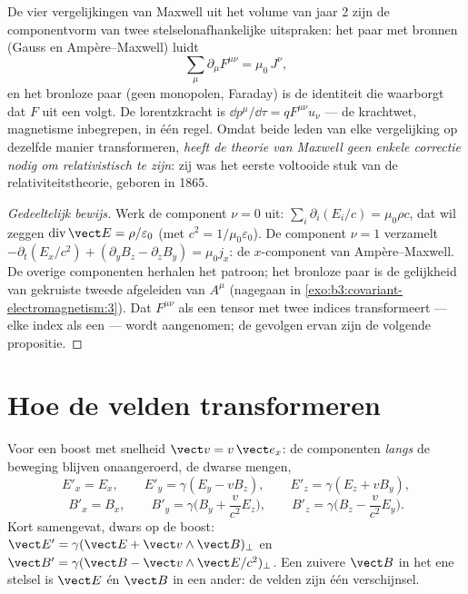 \begin{theorem}\label{thm:b3:covariant-electromagnetism:maxwell}
De vier vergelijkingen van Maxwell uit het volume van jaar 2 zijn de
componentvorm van twee stelselonafhankelijke uitspraken: het paar met
bronnen (Gauss en Ampère--Maxwell) luidt
\[
\sum_\mu \partial_\mu F^{\mu\nu} = \mu_0\,J^\nu ,
\]
en het bronloze paar (geen monopolen, Faraday) is de identiteit die
waarborgt dat $F$ uit een  volgt. De lorentzkracht is
$\dd p^\mu/\dd\tau = qF^{\mu\nu}u_\nu$ --- de krachtwet, magnetisme
inbegrepen, in één regel. Omdat beide leden van elke vergelijking op
dezelfde manier transformeren, \emph{heeft de theorie van Maxwell geen
enkele correctie nodig om relativistisch te zijn}: zij was het eerste
voltooide stuk van de relativiteitstheorie, geboren in 1865.
\end{theorem}

\begin{proof}[Gedeeltelijk bewijs]
Werk de component $\nu = 0$ uit: $\sum_i\partial_i(E_i/c) =
\mu_0\rho c$,
dat wil zeggen $\operatorname{div}\vect E = \rho/\varepsilon_0$ (met $c^2 = 1/\mu_0\varepsilon_0$). De component $\nu = 1$ verzamelt
$-\partial_t(E_x/c^2) + (\partial_yB_z - \partial_zB_y)
= \mu_0 j_x$: de
$x$-component van Ampère--Maxwell. De overige componenten herhalen het
patroon; het bronloze paar is de gelijkheid van gekruiste tweede
afgeleiden van $A^\mu$ (nagegaan in
\cref{exo:b3:covariant-electromagnetism:3}). Dat $F^{\mu\nu}$ als een
tensor met twee indices transformeert --- elke index als een 
--- wordt aangenomen; de gevolgen ervan zijn de volgende propositie.
\end{proof}

\section{Hoe de velden transformeren}

\begin{proposition}\label{prop:b3:covariant-electromagnetism:transform}
Voor een boost met snelheid $\vect v = v\,\vect e_x$: de componenten
\emph{langs} de beweging blijven onaangeroerd, de dwarse mengen,
\[
E'_x = E_x , \qquad
E'_y = \gamma(E_y - vB_z) , \qquad
E'_z = \gamma(E_z + vB_y) ,
\]
\[
B'_x = B_x , \qquad
B'_y = \gamma\Big(B_y + \frac{v}{c^2}E_z\Big) , \qquad
B'_z = \gamma\Big(B_z - \frac{v}{c^2}E_y\Big) .
\]
Kort samengevat, dwars op de boost: $\vect E' = \gamma(\vect E +
\vect v\wedge\vect B)_\perp$ en $\vect B' = \gamma(\vect B - \vect
v\wedge\vect E/c^2)_\perp$. Een zuivere $\vect B$ in het ene stelsel is $\vect
E$ én
$\vect B$ in een ander: de velden zijn één verschijnsel.
\end{proposition}
\admitted

